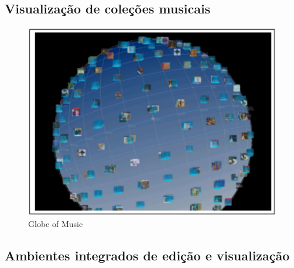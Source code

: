 \documentclass{sciposter}
\begin{document}
\begin{multicols}{2}
\begin{center}
\end{center}

\subsection{Visualização de coleções musicais}

\begin{center}

\begin{figure}[!h]
  \centering
  \includegraphics{./figs/topf-globe.pdf}
  \caption{Globe of Music \cite{Leitich2007}}
  \label{fig:label-figura}
\end{figure}

\end{center}

\subsection{Ambientes integrados de edição e visualização}

\begin{center}


\end{center}
\end{multicols}
\end{document}
